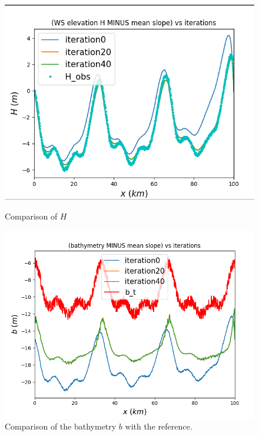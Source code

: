 \documentclass{article}
\begin{document}
\begin{figure}[H]
    \begin{minipage}[b]{0.45\linewidth}
        \centering
        \includegraphics[width=\linewidth]{Images_Ayoub/With_Regularisation/Alpha_Const/Graphs/H_Comparaison.png}
        \caption{Comparison of \( H \)}
        \label{fig:wr-rmse}
    \end{minipage}
    \hfill
    \begin{minipage}[b]{0.45\linewidth}
        \centering
        \includegraphics[width=\linewidth]{Images_Ayoub/With_Regularisation/Alpha_Const/Graphs/b_Comparaison.png}
        \caption{Comparison of the bathymetry \( b \) with the reference.}
        \label{fig:wr-b-comparaison}
    \end{minipage}


\end{figure}
\end{document}
